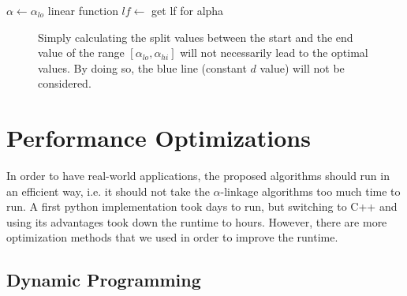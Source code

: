 \begin{algorithm}[H]
    $\alpha \gets \alpha_{lo}$\;
    linear function $lf \gets$ get lf for alpha\;
    \caption{}
    \label{alg:alphalinkage4}
\end{algorithm}

\begin{figure}[h]
    \centering
    \caption{Simply calculating the split values between the start and the end value of the range $[\alpha_{lo}, \alpha_{hi}]$ will not necessarily lead to the optimal values. By doing so, the blue line (constant $d$ value) will not be considered.}
    \label{fig:optimal}
\end{figure}

\section{Performance Optimizations}

In order to have real-world applications, the proposed algorithms should run in an efficient way, i.e. it should not take the $\alpha$-linkage algorithms too much time to run. A first python implementation took days to run, but switching to C++ and using its advantages took down the runtime to hours. However, there are more optimization methods that we used in order to improve the runtime.

\subsection{Dynamic Programming}

